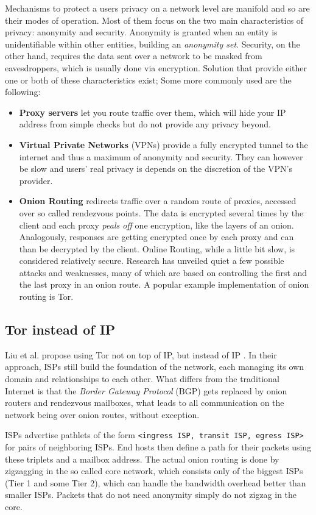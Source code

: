 \documentclass{acm_proc_article-sp}
\begin{document}
Mechanisms to protect a users privacy on a network level are manifold and so are their modes of operation. Most of them focus on the two main characteristics of privacy: anonymity and security. Anonymity is granted when an entity is unidentifiable within other entities, building an \emph{anonymity set}. Security, on the other hand, requires the data sent over a network to be masked from eavesdroppers, which is usually done via encryption. Solution that provide either one or both of these characteristics exist; Some more commonly used are the following:
\begin{itemize}
\item \textbf{Proxy servers} let you route traffic over them, which will hide your IP address from simple checks but do not provide any privacy beyond.
\item \textbf{Virtual Private Networks} (VPNs) provide a fully encrypted tunnel to the internet and thus a maximum of anonymity and security. They can however be slow and users' real privacy is depends on the discretion of the VPN's provider.
\item \textbf{Onion Routing} redirects traffic over a random route of proxies, accessed over so called rendezvous points. The data is encrypted several times by the client and each proxy \emph{peals off} one encryption, like the layers of an onion. Analogously, responses are getting encrypted once by each proxy and can than be decrypted by the client. Online Routing, while a little bit slow, is considered relatively secure. Research has unveiled quiet a few possible attacks and weaknesses, many of which are based on controlling the first and the last proxy in an onion route. A popular example implementation of onion routing is Tor.
\end{itemize}
\subsection{Tor instead of IP}
Liu et al. propose using Tor not on top of IP, but instead of IP \cite{tor}. In their approach, ISPs still build the foundation of the network, each managing its own domain and relationships to each other. What differs from the traditional Internet is that the \emph{Border Gateway Protocol} (BGP) gets replaced by onion routers and rendezvous mailboxes, what leads to all communication on the network being over onion routes, without exception.

ISPs advertise pathlets \cite{pathlet} of the form \texttt{<ingress ISP, transit ISP, egress ISP>} for pairs of neighboring ISPs. End hosts then define a path for their packets using these triplets and a mailbox address. The actual onion routing is done by zigzagging in the so called core network, which consists only of the biggest ISPs (Tier 1 and some Tier 2), which can handle the bandwidth overhead better than smaller ISPs. Packets that do not need anonymity simply do not zigzag in the core.
\end{document}
